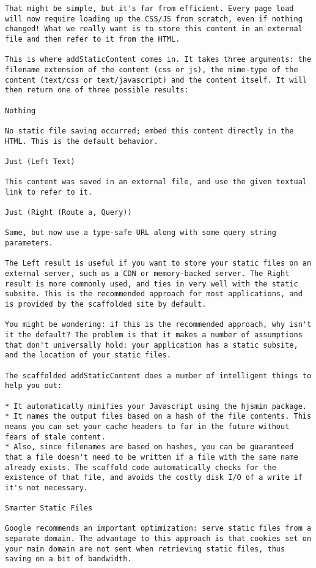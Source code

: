 \begin{lstlisting}
That might be simple, but it's far from efficient. Every page load will now require loading up the CSS/JS from scratch, even if nothing changed! What we really want is to store this content in an external file and then refer to it from the HTML.

This is where addStaticContent comes in. It takes three arguments: the filename extension of the content (css or js), the mime-type of the content (text/css or text/javascript) and the content itself. It will then return one of three possible results:

Nothing

No static file saving occurred; embed this content directly in the HTML. This is the default behavior.

Just (Left Text)

This content was saved in an external file, and use the given textual link to refer to it.

Just (Right (Route a, Query))

Same, but now use a type-safe URL along with some query string parameters.

The Left result is useful if you want to store your static files on an external server, such as a CDN or memory-backed server. The Right result is more commonly used, and ties in very well with the static subsite. This is the recommended approach for most applications, and is provided by the scaffolded site by default.

You might be wondering: if this is the recommended approach, why isn't it the default? The problem is that it makes a number of assumptions that don't universally hold: your application has a static subsite, and the location of your static files.

The scaffolded addStaticContent does a number of intelligent things to help you out:

* It automatically minifies your Javascript using the hjsmin package.
* It names the output files based on a hash of the file contents. This means you can set your cache headers to far in the future without fears of stale content.
* Also, since filenames are based on hashes, you can be guaranteed that a file doesn't need to be written if a file with the same name already exists. The scaffold code automatically checks for the existence of that file, and avoids the costly disk I/O of a write if it's not necessary.

Smarter Static Files

Google recommends an important optimization: serve static files from a separate domain. The advantage to this approach is that cookies set on your main domain are not sent when retrieving static files, thus saving on a bit of bandwidth.


\end{lstlisting}
